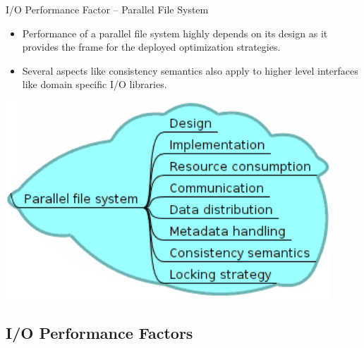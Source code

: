 \documentclass[compress,11pt,xcolor=svgnames,aspectratio=169]{beamer}
\begin{document}
\begin{frame}[fragile]{I/O Performance Factor -- Parallel File System}

\begin{itemize}
\setlength\itemsep{0.5cm}

  \item Performance of a parallel file system highly depends on its design as it provides the frame for the deployed optimization strategies.

  \item Several aspects like consistency semantics also apply to higher level interfaces like domain specific I/O libraries.

\end{itemize}


\begin{center}
\includegraphics[scale=0.5]{fig/tree-io-pfs}
\end{center}

\nocite{SOPPOAASLK13}

\end{frame}

\subsection{I/O Performance Factors}
\end{document}
